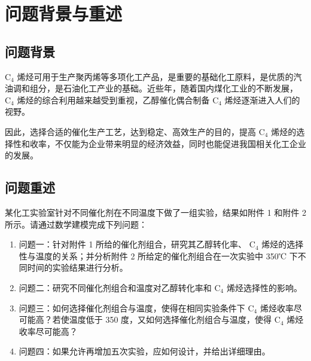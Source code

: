\section{问题背景与重述}
\subsection{问题背景}
 \( \text{C}_4 \) 烯烃可用于生产聚丙烯等多项化工产品，是重要的基础化工原料，是优质的汽油调和组分，是石油化工产业的基础。近些年，随着国内煤化工业的不断发展， \( \text{C}_4 \) 烯烃的综合利用越来越受到重视，乙醇催化偶合制备 \( \text{C}_4 \) 烯烃逐渐进入人们的视野。

因此，选择合适的催化生产工艺，达到稳定、高效生产的目的，提高 \( \text{C}_4 \) 烯烃的选择性和收率，不仅能为企业带来明显的经济效益，同时也能促进我国相关化工企业的发展。







\subsection{问题重述}
某化工实验室针对不同催化剂在不同温度下做了一组实验，结果如附件 1 和附件 2 所示。请通过数学建模完成下列问题：

\begin{enumerate}
	\item 问题一：针对附件 1 所给的催化剂组合，研究其乙醇转化率、 \( \text{C}_4 \) 烯烃的选择性与温度的关系；并分析附件 2 所给定的催化剂组合在一次实验中 350℃ 下不同时间的实验结果进行分析。
	
	\item 问题二：研究不同催化剂组合和温度对乙醇转化率和 \( \text{C}_4 \) 烯烃选择性的影响。
	
	\item 问题三：如何选择催化剂组合与温度，使得在相同实验条件下 \( \text{C}_4 \) 烯烃收率尽可能高？若使温度低于 350 度，又如何选择催化剂组合与温度，使得 \( \text{C}_4 \) 烯烃收率尽可能高？
	
	\item 问题四：如果允许再增加五次实验，应如何设计，并给出详细理由。
\end{enumerate}